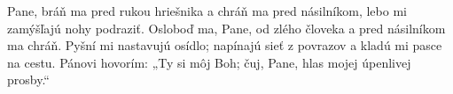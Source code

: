 Pane, bráň ma pred rukou hriešnika
a chráň ma pred násilníkom,
lebo mi zamýšľajú nohy podraziť.
\versseparator
Osloboď ma, Pane, od zlého človeka
a pred násilníkom ma chráň.
\versseparator
Pyšní mi nastavujú osídlo;
napínajú sieť z povrazov
a kladú mi pasce na cestu.
\versseparator
Pánovi hovorím: „Ty si môj Boh;
čuj, Pane, hlas mojej úpenlivej prosby.“